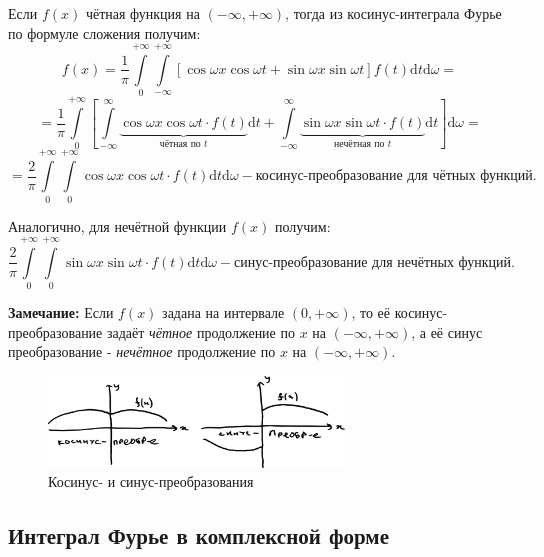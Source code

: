 \documentclass[12pt, a4paper]{article}
\newcommand{\di}{\mathrm{d}}
\begin{document}
Если $f(x)$ чётная функция на $(-\infty, +\infty)$, тогда из косинус-интеграла Фурье по формуле сложения получим:
\[f(x) = \frac{1}{\pi} \int \limits_0^{+\infty} \int \limits_{-\infty}^{+\infty} [\cos \omega x \cos \omega t + \sin \omega x \sin \omega t] f(t) \di t \di \omega = \]
\[= \frac{1}{\pi} \int \limits_0^{+\infty} \left[ \int \limits_{-\infty}^{\infty} \underbrace{\cos \omega x \cos \omega t \cdot f(t)}_{\textrm{чётная по } t} \di t + \int \limits_{-\infty}^{\infty} \underbrace{\sin \omega x \sin \omega t \cdot f(t)}_{\textrm{нечётная по } t} \di t \right] \di \omega = \]
\[= \frac{2}{\pi} \int \limits_0^{+\infty} \int \limits_0^{+\infty} \cos \omega x \cos \omega t \cdot f(t) \di t \di \omega - \textbf{косинус-преобразование для чётных функций.} \]

Аналогично, для нечётной функции $f(x)$ получим:
\[\frac{2}{\pi} \int \limits_0^{+\infty} \int \limits_0^{+\infty} \sin \omega x \sin \omega t \cdot f(t) \di t \di \omega - \textbf{синус-преобразование для нечётных функций.} \]

\textbf{Замечание:} Если $f(x)$ задана на интервале $(0, +\infty)$, то её косинус-преобразование задаёт \textit{чётное} продолжение по $x$ на $(-\infty, +\infty)$, а её синус преобразование - \textit{нечётное} продолжение по $x$ на $(-\infty, +\infty)$.

\begin{figure}[h]
 \centering
 \includegraphics[width=0.7\textwidth]{16}
 \vspace{-4mm}
  \caption{Косинус- и синус-преобразования}
\end{figure}

\subsection{Интеграл Фурье в комплексной форме}
\end{document}
